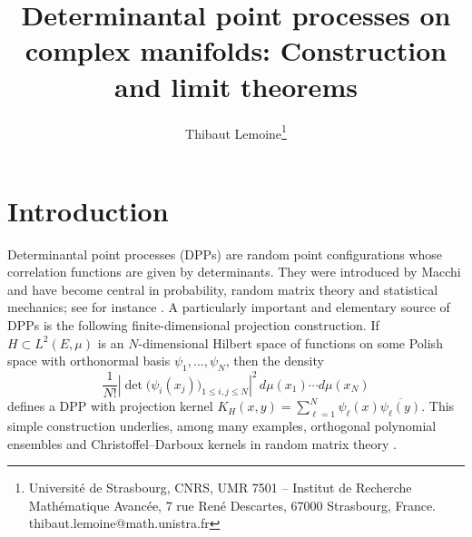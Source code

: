 \documentclass[12pt,a4paper,reqno]{article}
\theoremstyle{thmstyleone}
\theoremstyle{thmstylethree}
\theoremstyle{thmstyletwo}
\numberwithin{equation}{subsection}
\def\leq{\leqslant}
\begin{document}
\author{Thibaut Lemoine\thanks{Universit\'e de Strasbourg, CNRS, UMR 7501 -- Institut de Recherche Math\'ematique Avanc\'ee, 7 rue Ren\'e Descartes, 67000 Strasbourg, France. thibaut.lemoine@math.unistra.fr}}

\title{Determinantal point processes on complex manifolds: Construction and limit theorems}





\maketitle


\tableofcontents

\section{Introduction}

Determinantal point processes (DPPs) are random point configurations whose correlation functions are given by determinants.  They were introduced by Macchi \cite{Mac2} and have become central in probability, random matrix theory and statistical mechanics; see for instance \cite{Sos,Lyo,ShiTak,Joh,HKPV,DPP-Fermion}.  A particularly important and elementary source of DPPs is the following finite-dimensional projection construction.  If $H\subset L^2(E,\mu)$ is an $N$-dimensional Hilbert space of functions on some Polish space with orthonormal basis $\psi_1,\ldots,\psi_N$, then the density
\[
\frac1{N!}
\left|\det\bigl(\psi_i(x_j)\bigr)_{1\leq i,j\leq N}\right|^2
\,d\mu(x_1)\cdots d\mu(x_N)
\]
defines a DPP with projection kernel $K_H(x,y)=\sum_{\ell=1}^N\psi_\ell(x)\overline{\psi_\ell(y)}.$ This simple construction underlies, among many examples, orthogonal polynomial ensembles and Christoffel--Darboux kernels in random matrix theory \cite{Meh,For,Dei,Joh,Bor,BS}.
\end{document}
